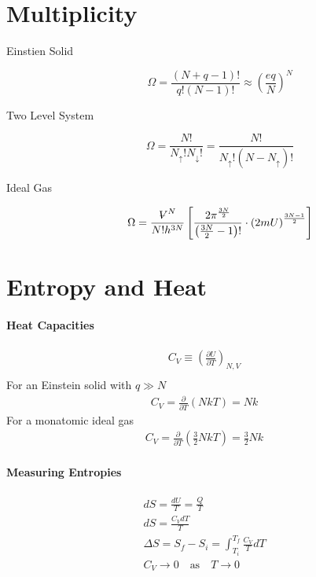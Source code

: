 \documentclass[10pt]{article}
\newcommand{\V}{{\ooalign{\hfil$V$\hfil\cr\kern0.08em--\hfil\cr}}}
\begin{document}
\section{Multiplicity}%
\label{sec:multiplicity}

\begin{description}
  \item[Einstien Solid]
    $$\Omega=\frac{\left(N+q-1\right)!}{q!\left(N-1\right)!}\approx\left(\frac{eq}{N}\right)^N$$
  \item[Two Level System]
    $$\Omega=\frac{N!}{N_\uparrow!N_\downarrow!}=\frac{N!}{N_\uparrow!\left(N-N_\uparrow\right)!}$$
  \item[Ideal Gas]
    $$\Omega=\frac{\V^N}{N!h^{3N}}\left[\frac{2\pi^{\frac{3N}{2}}}{\left(\frac{3N}{2}-1\right)!}\cdot\left(2mU\right)^{\frac{3N-1}{2}}\right]$$
\end{description}

\section{Entropy and Heat}%
\label{sec:entropy_and_heat}

\paragraph{Heat Capacities}%
\label{par:heat_capacities}

\begin{align}
  C_V\equiv\left(\frac{\partial U}{\partial T}\right)_{N,V}\\
\end{align}
For an Einstein solid with $q \gg N$
\begin{align}
  C_V=\frac{\partial}{\partial T}\left(NkT\right)=Nk
\end{align}
For a monatomic ideal gas
\begin{align}
  C_V=\frac{\partial}{\partial T}\left(\frac{3}{2}NkT\right)=\frac{3}{2}Nk
\end{align}

\paragraph{Measuring Entropies}%
\label{par:measuring_entropies}

\begin{align}
  dS =\frac{dU}{T}=\frac{Q}{T}\\
  dS=\frac{C_VdT}{T}\\
  \Delta S=S_f-S_i=\int_{T_i}^{T_f}\frac{C_V}{T}dT\\
  C_V\rightarrow0\quad\text{as}\quad T\rightarrow0
\end{align}
\end{document}
